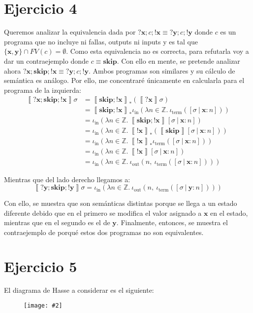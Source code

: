 \documentclass{article}
\newcommand{\addfig}[2]{\begin{figure}[!htb] \centering \texttt{[image: \#2]}\end{figure}}
\newcommand{\sem}[1]{\left\llbracket #1\right\rrbracket}
\newcommand{\Z}{\mathbb{Z}}
\newcommand{\x}{\textbf{x}}
\newcommand{\y}{\textbf{y}}
\newcommand{\cskip}{\textbf{skip}}
\newcommand{\iterm}[1]{\iota_\text{term}\left(#1\right)}
\newcommand{\iout}[2]{\iota_\text{out}\left(#1,\ #2\right)}
\newcommand{\iin}[2]{\iota_\text{in}\left(\lambda #1 \in \Z .\ #2\right)}
\begin{document}
\section*{Ejercicio 4}
Queremos analizar la equivalencia dada por $?\x; c; !\x \equiv ?\y; c; !\y$ donde $c$ es un programa que no incluye ni fallas, outputs ni inputs y es tal que $\{\x, \y\} \cap FV(c) = \emptyset$.
Como esta equivalencia no es correcta, para refutarla voy a dar un contraejemplo donde $c \equiv \cskip$.
Con ello en mente, se pretende analizar ahora $?\x; \cskip; !\x \equiv ?\y; c; !\y$.
Ambos programas son similares y su cálculo de semántica es análogo.
Por ello, me concentraré únicamente en calcularla para el programa de la izquierda:
\begin{equation*}
  \begin{aligned}
    \sem{?\x; \cskip; !\x}\sigma &= \sem{\cskip; !\x}_* (\sem{?\x}\sigma) \\ 
                                 &= \sem{\cskip; !\x}_* \iin{n}{\iterm{[\sigma\ |\ \x : n]}} \\ 
                                 &= \iin{n}{\sem{\cskip; !\x}[\sigma\ |\ \x : n]} \\ 
                                 &= \iin{n}{\sem{!\x}_* (\sem{\cskip}[\sigma\ |\ \x : n])} \\ 
                                 &= \iin{n}{\sem{!\x}_* \iterm{[\sigma\ |\ \x : n]}} \\ 
                                 &= \iin{n}{\sem{!\x}[\sigma\ |\ \x : n]} \\ 
                                 &= \iin{n}{\iout{n}{\iterm{[\sigma\ |\ \x : n]}}}
  \end{aligned}
\end{equation*}

Mientras que del lado derecho llegamos a:
\begin{equation*}
  \sem{?\y; \cskip; !\y}\sigma = \iin{n}{\iout{n}{\iterm{[\sigma\ |\ \y : n]}}}
\end{equation*}

Con ello, se muestra que son semánticas distintas porque se llega a un estado diferente debido que en el primero se modifica el valor asignado a $\x$ en el estado, mientras que en el segundo es el de $\y$.
Finalmente, entonces, se muestra el contraejemplo de porqué estos dos programas no son equivalentes.

\section*{Ejercicio 5}
El diagrama de Hasse a considerar es el siguiente:
\addfig{0.7}{06-05.png}
\end{document}
